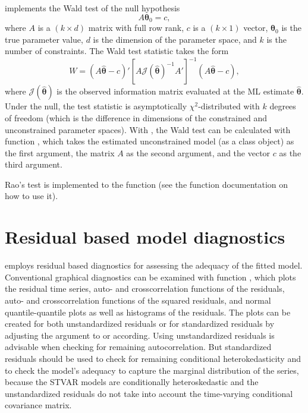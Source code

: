 \documentclass[nojss]{jss}
\begin{document}
 implements the Wald test of the null hypothesis
\begin{equation}
A\boldsymbol{\theta}_0 = c,
\end{equation}
where $A$ is a $(k \times d)$ matrix with full row rank, $c$ is a $(k \times 1)$ vector, $\boldsymbol{\theta}_0$ is the true parameter value, $d$ is the dimension of the parameter space, and $k$ is the number of constraints. The Wald test statistic takes the form
\begin{equation}
W = (A\hat{\boldsymbol{\theta}} - c)' [A\mathcal{J}(\hat{\boldsymbol{\theta}})^{-1}A']^{-1}(A\hat{\boldsymbol{\theta}} - c),
\end{equation}
where $\mathcal{J}(\hat{\boldsymbol{\theta}})$ is the observed information matrix evaluated at the ML estimate $\hat{\boldsymbol{\theta}}$. Under the null, the test statistic is asymptotically $\chi^2$-distributed with $k$ degrees of freedom (which is the difference in dimensions of the constrained and unconstrained parameter spaces). With , the Wald test can be calculated with function , which takes the estimated unconstrained model (as a class  object) as the first argument, the matrix $A$ as the second argument, and the vector $c$ as the third argument.

Rao's test is implemented to the function  (see the function documentation on how to use it).

\section{Residual based model diagnostics}\label{sec:res}
 employs residual based diagnostics for assessing the adequacy of the fitted model. Conventional graphical diagnostics can be examined with function , which plots the residual time series, auto- and crosscorrelation functions of the residuals, auto- and crosscorrelation functions of the squared residuals, and normal quantile-quantile plots as well as histograms of the residuals. The plots can be created for both unstandardized residuals or for standardized residuals by adjusting the argument  to  or  according. Using unstandardized residuals is advisable when checking for remaining autocorrelation. But standardized residuals should be used to check for remaining conditional heterokedasticity and to check the model's adequacy to capture the marginal distribution of the series, because the STVAR models are conditionally heteroskedastic and the unstandardized residuals do not take into account the time-varying conditional covariance matrix.
\end{document}
